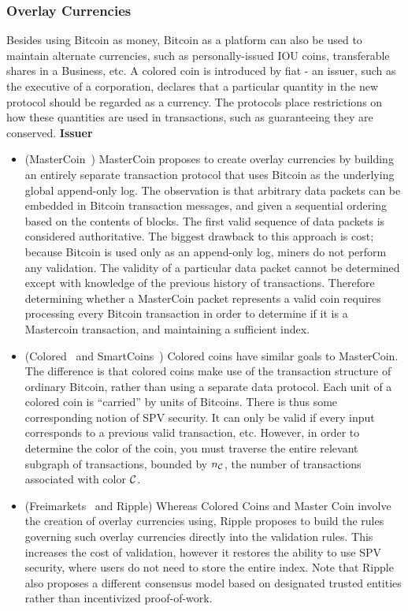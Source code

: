 \subsubsection{Overlay Currencies}
Besides using Bitcoin as money, Bitcoin as a platform can also be used to maintain alternate currencies, such as personally-issued IOU coins, transferable shares in a Business, etc. A colored coin is introduced by fiat - an issuer, such as the executive of a corporation, declares that a particular quantity in the new protocol should be regarded as a currency. The protocols place restrictions on how these quantities are used in transactions, such as guaranteeing they are conserved.
{\bf Issuer}

\begin{itemize}
\item (MasterCoin~\cite{mastercoin}) MasterCoin proposes to create overlay currencies by building an entirely separate transaction protocol that uses Bitcoin as the underlying global append-only log. The observation is that arbitrary data packets can be embedded in Bitcoin transaction messages, and given a sequential ordering based on the contents of blocks. The first valid sequence of data packets is considered authoritative. The biggest drawback to this approach is cost; because Bitcoin is used only as an append-only log, miners do not perform any validation. The validity of a particular data packet cannot be determined except with knowledge of the previous history of transactions. Therefore determining whether a MasterCoin packet represents a valid coin requires processing every Bitcoin transaction in order to determine if it is a Mastercoin transaction, and maintaining a sufficient index.

\item (Colored~\cite{coloredcoins,bitcointalk-coloredcoins} and SmartCoins~\cite{jgarzik-smartcoin}) Colored coins have similar goals to MasterCoin. The difference is that colored coins make use of the transaction structure of ordinary Bitcoin, rather than using a separate data protocol. Each unit of a colored coin is ``carried'' by units of Bitcoins. There is thus some corresponding notion of SPV security. It can only be valid if every input corresponds to a previous valid transaction, etc. However, in order to determine the color of the coin, you must traverse the entire relevant subgraph of transactions, bounded by $n_{\cal C}$, the number of transactions associated with color ${\cal C}$.

\item (Freimarkets~\cite{freimarkets} and Ripple) Whereas Colored Coins and Master Coin involve the creation of overlay currencies using, Ripple proposes to build the rules governing such overlay currencies directly into the validation rules. This increases the cost of validation, however it restores the ability to use SPV security, where users do not need to store the entire index. Note that Ripple also proposes a different consensus model based on designated trusted entities rather than incentivized proof-of-work.


\end{itemize}
